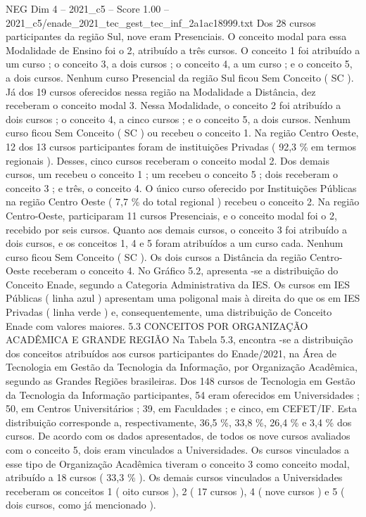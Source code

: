 \begin{textsample}{NEG Dim 4 – 2021\_c5 – Score 1.00 – 2021\_c5/enade\_2021\_tec\_gest\_tec\_inf\_2a1ac18999.txt}
Dos 28 cursos participantes da região Sul, nove eram Presenciais.
O conceito modal para essa Modalidade de Ensino foi o 2, atribuído a três cursos.
O conceito 1 foi atribuído a um curso ; o conceito 3, a dois cursos ; o conceito 4, a um curso ; e o conceito 5, a dois cursos.
Nenhum curso Presencial da região Sul ficou Sem Conceito ( SC ).
Já dos 19 cursos oferecidos nessa região na Modalidade a Distância, dez receberam o conceito modal 3.
Nessa Modalidade, o conceito 2 foi atribuído a dois cursos ; o conceito 4, a cinco cursos ; e o conceito 5, a dois cursos.
Nenhum curso ficou Sem Conceito ( SC ) ou recebeu o conceito 1.
Na região Centro Oeste, 12 dos 13 cursos participantes foram de instituições Privadas ( 92,3 \% em termos regionais ).
Desses, cinco cursos receberam o conceito modal 2.
Dos demais cursos, um recebeu o conceito 1 ; um recebeu o conceito 5 ; dois receberam o conceito 3 ; e três, o conceito 4.
O único curso oferecido por Instituições Públicas na região Centro Oeste ( 7,7 \% do total regional ) recebeu o conceito 2.
Na região Centro-Oeste, participaram 11 cursos Presenciais, e o conceito modal foi o 2, recebido por seis cursos.
Quanto aos demais cursos, o conceito 3 foi atribuído a dois cursos, e os conceitos 1, 4 e 5 foram atribuídos a um curso cada.
Nenhum curso ficou Sem Conceito ( SC ).
Os dois cursos a Distância da região Centro-Oeste receberam o conceito 4.
No Gráfico 5.2, apresenta -se a distribuição do Conceito Enade, segundo a Categoria Administrativa da IES.
Os cursos em IES Públicas ( linha azul ) apresentam uma poligonal mais à direita do que os em IES Privadas ( linha verde ) e, consequentemente, uma distribuição de Conceito Enade com valores maiores. 5.3 CONCEITOS POR ORGANIZAÇÃO ACADÊMICA E GRANDE REGIÃO Na Tabela 5.3, encontra -se a distribuição dos conceitos atribuídos aos cursos participantes do Enade/2021, na Área de Tecnologia em Gestão da Tecnologia da Informação, por Organização Acadêmica, segundo as Grandes Regiões brasileiras.
Dos 148 cursos de Tecnologia em Gestão da Tecnologia da Informação participantes, 54 eram oferecidos em Universidades ; 50, em Centros Universitários ; 39, em Faculdades ; e cinco, em CEFET/IF.
Esta distribuição corresponde a, respectivamente, 36,5 \%, 33,8 \%, 26,4 \% e 3,4 \% dos cursos.
De acordo com os dados apresentados, de todos os nove cursos avaliados com o conceito 5, dois eram vinculados a Universidades.
Os cursos vinculados a esse tipo de Organização Acadêmica tiveram o conceito 3 como conceito modal, atribuído a 18 cursos ( 33,3 \% ).
Os demais cursos vinculados a Universidades receberam os conceitos 1 ( oito cursos ), 2 ( 17 cursos ), 4 ( nove cursos ) e 5 ( dois cursos, como já mencionado ).

\end{textsample}
